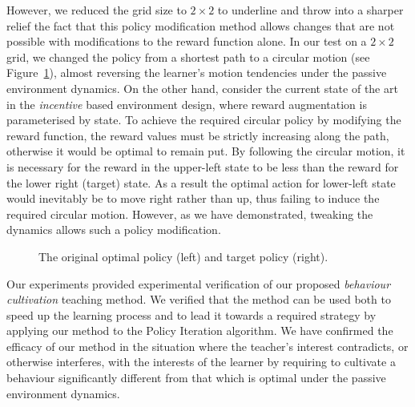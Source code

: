 However, we reduced the grid size to $2\times 2$ to underline and throw
into a sharper relief the fact that this policy modification method
allows changes that are not possible with modifications to the reward
function alone. In our test on a $2 \times 2$ grid, we changed the
policy from a shortest path to a circular motion (see
Figure~\ref{envdopt}), almost reversing the learner's motion
tendencies under the passive environment dynamics. On the other hand,
consider the current state of the art in the {\em incentive} based
environment design, where reward augmentation is parameterised by
state. To achieve the required circular policy by modifying the reward
function, the reward values must be strictly increasing along the
path, otherwise it would be optimal to remain put. By following the
circular motion, it is necessary for the reward in the upper-left
state to be less than the reward for the lower right (target)
state. As a result the optimal action for lower-left state would
inevitably be to move right rather than up, thus failing to induce the
required circular motion. However, as we have demonstrated, tweaking
the dynamics allows such a policy modification.

\begin{figure}[ht]
\centerline{}
\caption{\label{envdopt}The original optimal policy (left) and target policy (right).}
\end{figure}

Our experiments provided experimental verification of our proposed
{\em behaviour cultivation} teaching method.  We verified that the
method can be used both to speed up the learning process and to lead
it towards a required strategy by applying our method to the Policy
Iteration algorithm. We have confirmed the efficacy of our method in
the situation where the teacher's interest contradicts, or otherwise
interferes, with the interests of the learner by requiring to
cultivate a behaviour significantly different from that which is
optimal under the passive environment dynamics.
